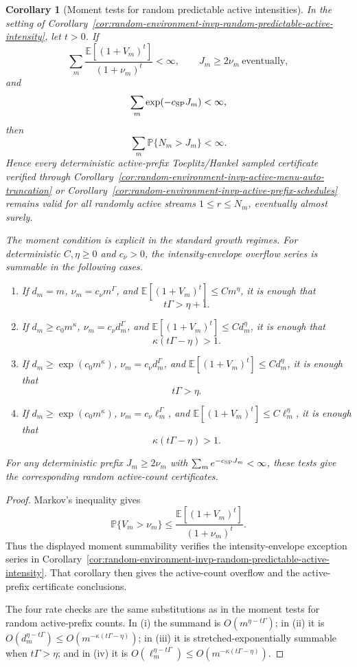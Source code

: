 \documentclass[11pt]{amsart}
\numberwithin{equation}{section}
\newtheorem{corollary}[theorem]{Corollary}
\theoremstyle{definition}
\theoremstyle{remark}
\newcommand{\Prob}{\mathbb P}
\newcommand{\Exp}{\mathbb E}
\begin{document}
\begin{corollary}[Moment tests for random predictable active intensities]
\label{cor:random-environment-invp-moment-predictable-active-intensity}
In the setting of
Corollary~\ref{cor:random-environment-invp-random-predictable-active-intensity},
let \(t>0\).  If
\[
  \sum_m
  \frac{\Exp[(1+V_m)^t]}{(1+\nu_m)^t}<\infty,
  \qquad
  J_m\ge2\nu_m\ \text{eventually},
\]
and
\[
  \sum_m\exp(-c_{\rm SP}J_m)<\infty,
\]
then
\[
  \sum_m\Prob\{N_m>J_m\}<\infty .
\]
Hence every deterministic active-prefix Toeplitz/Hankel sampled certificate
verified through
Corollary~\ref{cor:random-environment-invp-active-menu-auto-truncation} or
Corollary~\ref{cor:random-environment-invp-active-prefix-schedules} remains
valid for all randomly active streams \(1\le r\le N_m\), eventually almost
surely.

The moment condition is explicit in the standard growth regimes.  For
deterministic \(C,\eta\ge0\) and \(c_\nu>0\), the intensity-envelope overflow
series is summable in the following cases.
\begin{enumerate}[label=\textup{(\roman*)},leftmargin=2.2em]
\item If \(d_m=m\), \(\nu_m=c_\nu m^\Gamma\), and
\(\Exp[(1+V_m)^t]\le Cm^\eta\), it is enough that
\[
  t\Gamma>\eta+1 .
\]
\item If \(d_m\ge c_0m^\kappa\), \(\nu_m=c_\nu d_m^\Gamma\), and
\(\Exp[(1+V_m)^t]\le Cd_m^\eta\), it is enough that
\[
  \kappa(t\Gamma-\eta)>1 .
\]
\item If \(d_m\ge\exp(c_0m^\kappa)\), \(\nu_m=c_\nu d_m^\Gamma\), and
\(\Exp[(1+V_m)^t]\le Cd_m^\eta\), it is enough that
\[
  t\Gamma>\eta .
\]
\item If \(d_m\ge\exp(c_0m^\kappa)\), \(\nu_m=c_\nu\ell_m^\Gamma\), and
\(\Exp[(1+V_m)^t]\le C\ell_m^\eta\), it is enough that
\[
  \kappa(t\Gamma-\eta)>1 .
\]
\end{enumerate}
For any deterministic prefix \(J_m\ge2\nu_m\) with
\(\sum_m e^{-c_{\rm SP}J_m}<\infty\), these tests give the corresponding
random active-count certificates.
\end{corollary}

\begin{proof}
Markov's inequality gives
\[
  \Prob\{V_m>\nu_m\}
  \le
  \frac{\Exp[(1+V_m)^t]}{(1+\nu_m)^t}.
\]
Thus the displayed moment summability verifies the intensity-envelope
exception series in
Corollary~\ref{cor:random-environment-invp-random-predictable-active-intensity}.
That corollary then gives the active-count overflow and the active-prefix
certificate conclusions.

The four rate checks are the same substitutions as in the moment tests for
random active-prefix counts.  In \textup{(i)} the summand is
\(O(m^{\eta-t\Gamma})\); in \textup{(ii)} it is
\(O(d_m^{\eta-t\Gamma})\le O(m^{-\kappa(t\Gamma-\eta)})\); in \textup{(iii)}
it is stretched-exponentially summable when \(t\Gamma>\eta\); and in
\textup{(iv)} it is
\(O(\ell_m^{\eta-t\Gamma})\le O(m^{-\kappa(t\Gamma-\eta)})\).
\end{proof}
\end{document}
